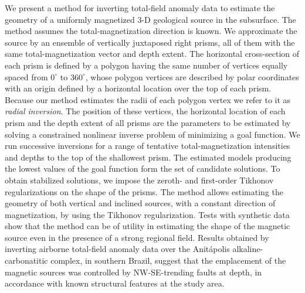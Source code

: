 \begin{summary}
We present a method for inverting total-field anomaly data to estimate the geometry of 
a uniformly magnetized 3-D geological source in the subsurface. The method assumes 
the total-magnetization direction is known. 
We approximate the source by an ensemble of vertically juxtaposed right prisms, all of them with the same total-magnetization vector and depth extent. 
The horizontal cross-section of each prism is defined by a polygon having the same number of vertices equally spaced from $0^{\circ}$ to $360^{\circ}$,  whose polygon vertices 
are described by polar coordinates with an origin defined by a horizontal location 
over the top of each prism. 
Because our method estimates the radii of each polygon vertex  we refer to it as 
\textit{radial inversion}.
The position of these vertices, the horizontal location of each prism and the depth extent of all prisms are the parameters to be estimated by solving a constrained nonlinear inverse problem of minimizing a goal function. 
We run successive inversions for a range of tentative total-magnetization intensities 
and depths to the top of the shallowest prism. The estimated models producing 
the lowest values of the goal function form the set of candidate solutions.
To obtain stabilized solutions, we impose the zeroth- and first-order Tikhonov 
regularizations on the shape of the prisms. The method allows estimating the geometry 
of both vertical and inclined sources, with a constant direction of magnetization, 
by using the Tikhonov regularization. 
Tests with synthetic data show that the method can be of utility in estimating the shape of the magnetic source even in the presence of a strong regional field.
Results obtained by inverting airborne total-field anomaly data over the 
Anit{\'a}polis alkaline-carbonatitic complex, in southern Brazil, 
suggest that the emplacement of the magnetic sources was controlled by NW-SE-trending 
faults at depth, in accordance with known structural features at the study area.
\end{summary}